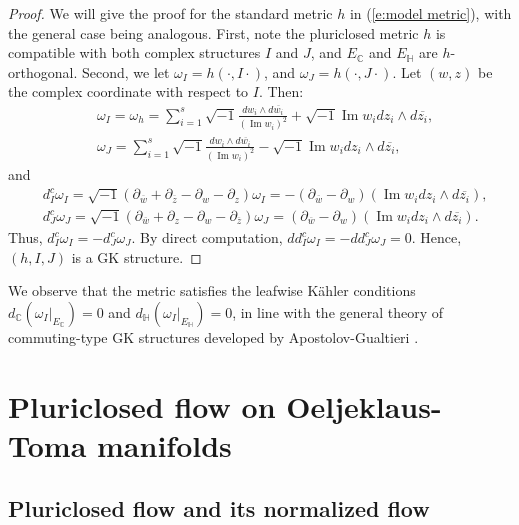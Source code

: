 \documentclass[12pt]{amsart}
\numberwithin{equation}{section}
\numberwithin{prop}{section}
\theoremstyle{definition}
\newcommand{\gw}{\omega}
\renewcommand{\bar}[1]{\overline{#1}}
\begin{document}
    \begin{proof} We will give the proof for the standard metric $h$ in (\ref{e:model metric}), with the general case being analogous.
        First, note the pluriclosed metric $h$ is compatible with both complex structures $I$ and $J$, and $E_\mathbb{C}$ and $E_\mathbb{H}$ are $h$-orthogonal. Second, we let $\omega_I = h(\cdot,I\cdot)$, and $\omega_J = h(\cdot,J\cdot)$. Let $(w,z)$ be the complex coordinate with respect to $I$. Then:
        \begin{align*}
            &\omega_I = \omega_h = \sum_{i=1}^s\sqrt{-1}\frac{dw_i\wedge d\bar{w_i}}{(\operatorname{Im}w_i)^2} + \sqrt{-1}\operatorname{Im}w_i dz_i\wedge d\bar{z_i},\\
            &\omega_J = \sum_{i=1}^s\sqrt{-1}\frac{dw_i\wedge d\bar{w_i}}{(\operatorname{Im}w_i)^2} - \sqrt{-1}\operatorname{Im}w_i dz_i\wedge d\bar{z_i},
        \end{align*}
        and
        \begin{align*}
            &d_I^c \omega_I = \sqrt{-1}(\partial_{\bar{w}}+\partial_{\bar{z}} - \partial_w - \partial_{z}) \omega_I = -(\partial_{\bar{w}} - \partial_w)(\operatorname{Im}w_i dz_i\wedge d\bar{z_i}),\\
            &d_J^c\omega_J = \sqrt{-1}(\partial_{\bar{w}}+\partial_z - \partial_w - \partial_{\bar{z}})\omega_J = (\partial_{\bar{w}} - \partial_w)(\operatorname{Im}w_i dz_i\wedge d\bar{z_i}).
        \end{align*}
        Thus, $d_I^c\omega_I = -d_J^c \omega_J$. By direct computation, $dd_I^c\omega_I = -dd_J^c\omega_J=0$.  Hence, $(h,I,J)$ is a GK structure.
    \end{proof}

We observe that the metric satisfies the leafwise K\"ahler conditions $d_{\mathbb C} \left(\left. \gw_I \right|_{E_{\mathbb C}} \right) = 0$ and $d_{\mathbb H} \left(\left. \gw_I \right|_{E_{\mathbb H}} \right) = 0$, in line with the general theory of commuting-type GK structures developed by Apostolov-Gualtieri \cite{ApostolovGualtieri}.

%
%
%
%
\section{Pluriclosed flow on Oeljeklaus-Toma manifolds}
%
%
%
%

%
%
\subsection{Pluriclosed flow and its normalized flow}
%
%
\end{document}
